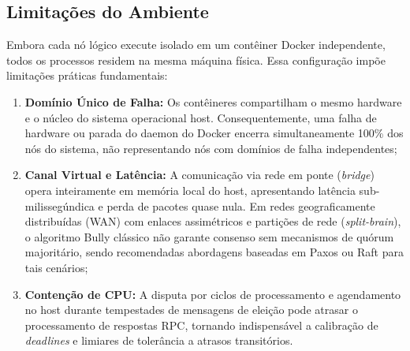 \subsection{Limitações do Ambiente}
Embora cada nó lógico execute isolado em um contêiner Docker independente, todos os processos residem na mesma máquina física. Essa configuração impõe limitações práticas fundamentais:
\begin{enumerate}
    \item \textbf{Domínio Único de Falha:} Os contêineres compartilham o mesmo hardware e o núcleo do sistema operacional host. Consequentemente, uma falha de hardware ou parada do daemon do Docker encerra simultaneamente 100\% dos nós do sistema, não representando nós com domínios de falha independentes;
    \item \textbf{Canal Virtual e Latência:} A comunicação via rede em ponte (\textit{bridge}) opera inteiramente em memória local do host, apresentando latência sub-milissegúndica e perda de pacotes quase nula. Em redes geograficamente distribuídas (WAN) com enlaces assimétricos e partições de rede (\textit{split-brain}), o algoritmo Bully clássico não garante consenso sem mecanismos de quórum majoritário, sendo recomendadas abordagens baseadas em Paxos ou Raft para tais cenários;
    \item \textbf{Contenção de CPU:} A disputa por ciclos de processamento e agendamento no host durante tempestades de mensagens de eleição pode atrasar o processamento de respostas RPC, tornando indispensável a calibração de \textit{deadlines} e limiares de tolerância a atrasos transitórios.
\end{enumerate}
